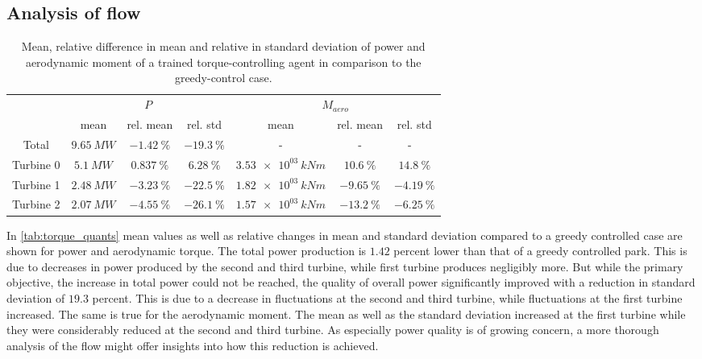 \subsection{Analysis of flow}
\begin{table}[h]
	\centering
	\caption{Mean, relative difference in mean and relative in standard deviation of power and aerodynamic moment of a trained torque-controlling agent in comparison to the greedy-control case.}
	\begin{tabular}{ccccccc}
		\toprule
		& \multicolumn{3}{c}{$P$}  & \multicolumn{3}{c}{$M_{aero}$ }\\ \cmidrule(rl){2-4} \cmidrule(rl){5-7}
		& mean & rel. mean & rel. std  & mean & rel. mean & rel. std \\ \midrule
		Total & $\SI{  9.65}{MW} $ & $\SI{ -1.42}{\%}$ & $\SI{ -19.3}{\%}$ &-&-&- \
		\\
		Turbine 0  & $\SI{   5.1}{MW} $ & $\SI{+0.837}{\%}$ & $\SI{ +6.28}{\%}$ & $\SI{3.53e03}{kNm} $ & $\SI{ +10.6}{\%}$ & $\SI{ +14.8}{\%}$ \\
		Turbine 1  & $\SI{  2.48}{MW} $ & $\SI{ -3.23}{\%}$ & $\SI{ -22.5}{\%}$ & $\SI{1.82e03}{kNm} $ & $\SI{ -9.65}{\%}$ & $\SI{ -4.19}{\%}$ \\
		Turbine 2  & $\SI{  2.07}{MW} $ & $\SI{ -4.55}{\%}$ & $\SI{ -26.1}{\%}$ & $\SI{1.57e03}{kNm} $ & $\SI{ -13.2}{\%}$ & $\SI{ -6.25}{\%}$ \\
		\bottomrule
	\end{tabular}
	\label{tab:torque_quants}
\end{table}
In \autoref{tab:torque_quants} mean values as well as relative changes in mean and standard deviation compared to a greedy controlled case are shown for power and aerodynamic torque. The total power production is $1.42$ percent lower than that of a greedy controlled park. This is due to decreases in power produced by the second and third turbine, while first turbine produces negligibly more. But while the primary objective, the increase in total power could not be reached, the quality of overall power significantly improved with a reduction in standard deviation of $19.3$ percent. This is due to a decrease in fluctuations at the second and third turbine, while fluctuations at the first turbine increased. The same is true for the aerodynamic moment. The mean as well as the standard deviation increased at the first turbine while they were considerably reduced at the second and third turbine. As especially power quality is of growing concern, a more thorough analysis of the flow might offer insights into how this reduction is achieved.
